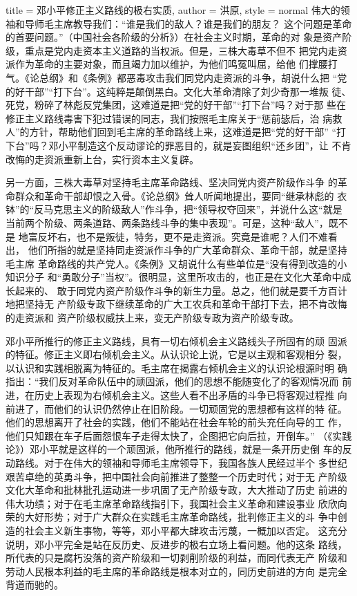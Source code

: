 \begin{hongqiarticle}{
        title  = {邓小平修正主义路线的极右实质},
        author = {洪原},
        style  = normal
    }
    伟大的领袖和导师毛主席教导我们：“谁是我们的敌人？谁是我们的朋友？
    这个问题是革命的首要问题。”（中国社会各阶级的分析》）在社会主义时期，革命的对
    象是资产阶级，重点是党内走资本主义道路的当权派。但是，三株大毒草不但不
    把党内走资派作为革命的主要对象，而且竭力加以维护，为他们鸣冤叫屈，给他
    们撑腰打气。《论总纲》和《条例》都恶毒攻击我们同党内走资派的斗争，胡说什么把
    “党的好干部”“打下台”。这纯粹是颠倒黑白。文化大革命清除了刘少奇那一堆叛
    徒、死党，粉碎了林彪反党集团，这难道是把“党的好干部”“打下台”吗？对于那
    些在修正主义路线毒害下犯过错误的同志，我们按照毛主席关于“惩前毖后，治
    病救人”的方针，帮助他们回到毛主席的革命路线上来，这难道是把“党的好干部”
    “打下台”吗？邓小平制造这个反动谬论的罪恶目的，就是妄图组织“还乡团”，让
    不肯改悔的走资派重新上台，实行资本主义复辟。

    另一方面，三株大毒草对坚持毛主席革命路线、坚决同党内资产阶级作斗争
    的革命群众和革命干部却恨之入骨。《论总纲》耸人听闻地提出，要同“继承林彪的
    衣钵”的“反马克思主义的阶级敌人”作斗争，把“领导权夺回来”，并说什么这“就是
    当前两个阶级、两条道路、两条路线斗争的集中表现”。可是，这种“敌人”，既不是
    地富反坏右，也不是叛徒，特务，更不是走资派。究竟是谁呢？人们不难看出，
    他们所指的就是坚持同走资派作斗争的广大革命群众、革命干部，就是坚持毛主席
    革命路线的共产党人。《条例》又胡说什么有些单位是“没有得到改造的小知识分子
    和“勇敢分子”当权”。很明显，这里所攻击的，也正是在文化大革命中成长起来的、
    敢于同党内资产阶级作斗争的新生力量。总之，他们就是要千方百计地把坚持无
    产阶级专政下继续革命的广大工农兵和革命干部打下去，把不肯改悔的走资派和
    资产阶级权威扶上来，变无产阶级专政为资产阶级专政。

    邓小平所推行的修正主义路线，具有一切右倾机会主义路线头子所固有的顽
    固派的特征。修正主义即右倾机会主义。从认识论上说，它是以主观和客观相分
    裂，以认识和实践相脱离为特征的。毛主席在揭露右倾机会主义的认识论根源时明
    确指出：“我们反对革命队伍中的顽固派，他们的思想不能随变化了的客观情况而
    前进，在历史上表现为右倾机会主义。这些人看不出矛盾的斗争已将客观过程推
    向前进了，而他们的认识仍然停止在旧阶段。一切顽固党的思想都有这样的特
    征。他们的思想离开了社会的实践，他们不能站在社会车轮的前头充任向导的工
    作，他们只知跟在车子后面怨恨车子走得太快了，企图把它向后拉，开倒车。”
    （《实践论》）邓小平就是这样的一个顽固派，他所推行的路线，就是一条开历史倒
    车的反动路线。对于在伟大的领袖和导师毛主席领导下，我国各族人民经过半个
    多世纪艰苦卓绝的英勇斗争，把中国社会向前推进了整整一个历史时代；对于无
    产阶级文化大革命和批林批孔运动进一步巩固了无产阶级专政，大大推动了历史
    前进的伟大功绩；对于在毛主席革命路线指引下，我国社会主义革命和建设事业
    欣欣向荣的大好形势；对于广大群众在实践毛主席革命路线，批判修正主义的斗
    争中创造的社会主义新生事物，等等，邓小平都大肆攻击污蔑，一概加以否定。
    这充分说明，邓小平完全是站在反历史、反进步的极右立场上看问题。他的这条
    路线，所代表的只是腐朽没落的资产阶级和一切剥削阶级的利益，而同代表无产
    阶级和劳动人民根本利益的毛主席的革命路线是根本对立的，同历史前进的方向
    是完全背道而驰的。


\end{hongqiarticle}
